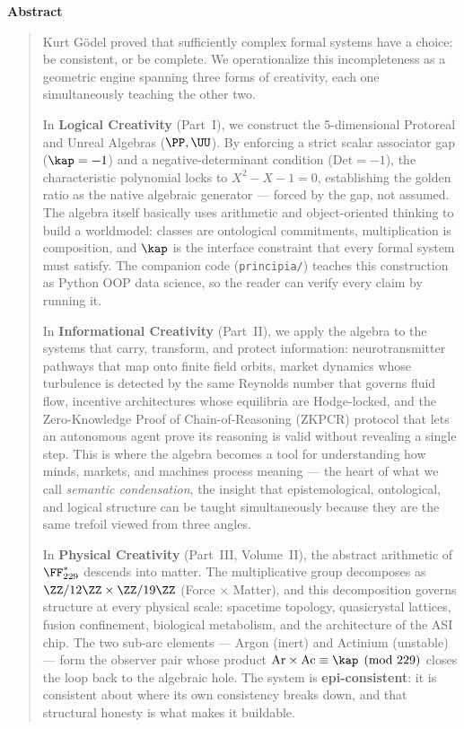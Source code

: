 \begin{center}\textbf{Abstract}\end{center}\begin{quotation}
Kurt G\"odel proved that sufficiently complex formal systems have a choice: be consistent, or be complete. We operationalize this incompleteness as a geometric engine spanning three forms of creativity, each one simultaneously teaching the other two.

In \textbf{Logical Creativity} (Part~I), we construct the 5-dimensional Protoreal and Unreal Algebras ($\PP, \UU$). By enforcing a strict scalar associator gap ($\kap = -1$) and a negative-determinant condition ($\mathrm{Det} = -1$), the characteristic polynomial locks to $X^2 - X - 1 = 0$, establishing the golden ratio as the native algebraic generator --- forced by the gap, not assumed. The algebra itself basically uses arithmetic and object-oriented thinking to build a worldmodel: classes are ontological commitments, multiplication is composition, and $\kap$ is the interface constraint that every formal system must satisfy. The companion code (\texttt{principia/}) teaches this construction as Python OOP data science, so the reader can verify every claim by running it.

In \textbf{Informational Creativity} (Part~II), we apply the algebra to the systems that carry, transform, and protect information: neurotransmitter pathways that map onto finite field orbits, market dynamics whose turbulence is detected by the same Reynolds number that governs fluid flow, incentive architectures whose equilibria are Hodge-locked, and the Zero-Knowledge Proof of Chain-of-Reasoning (ZKPCR) protocol that lets an autonomous agent prove its reasoning is valid without revealing a single step. This is where the algebra becomes a tool for understanding how minds, markets, and machines process meaning --- the heart of what we call \emph{semantic condensation}, the insight that epistemological, ontological, and logical structure can be taught simultaneously because they are the same trefoil viewed from three angles.

In \textbf{Physical Creativity} (Part~III, Volume~II), the abstract arithmetic of $\FF_{229}^*$ descends into matter. The multiplicative group decomposes as $\ZZ/12\ZZ \times \ZZ/19\ZZ$ (Force $\times$ Matter), and this decomposition governs structure at every physical scale: spacetime topology, quasicrystal lattices, fusion confinement, biological metabolism, and the architecture of the ASI chip. The two sub-arc elements --- Argon (inert) and Actinium (unstable) --- form the observer pair whose product $\mathrm{Ar} \times \mathrm{Ac} \equiv \kap \pmod{229}$ closes the loop back to the algebraic hole. The system is \textbf{epi-consistent}: it is consistent about where its own consistency breaks down, and that structural honesty is what makes it buildable.


\end{quotation}
